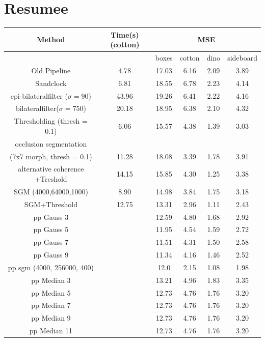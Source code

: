\documentclass  [
  paper    = a4,
  BCOR     = 10mm,
  twoside,
  fontsize = 12pt,
  fleqn,
  toc      = bibnumbered,
  toc      = listofnumbered,
  numbers  = noendperiod,
  headings = normal,
  listof   = leveldown,
  version  = 3.03
]                                       {scrreprt}
\begin{document}
\section{Resumee}
\begin{table}
	\begin{tabular}{|c|c|c|c|c|c|}
		\hline 
		Method & Time(s) (cotton) & \multicolumn{4}{c|}{MSE} \\ 
		\hline 
		&  & boxes & cotton & dino & sideboard \\ 
		\hline
		Old Pipeline & 4.78 & 17.03 & 6.16 & 2.09 & 3.89 \\
		\hline 
		Sandclock & 6.81  & 18.55  & 6.78  & 2.23  & 4.14 \\ 
		\hline 
		epi-bilateralfilter ($\sigma = 90$) &  43.96 &  19.26  & 6.41  & 2.22  & 4.16  \\ 
		\hline 
		bilateralfilter($\sigma = 750$) & 20.18  & 18.95  &  6.38 & 2.10  &4.32  \\ 
		\hline 
		Thresholding (thresh = 0.1) & 6.06 & 15.57  & 4.38  & 1.39  & 3.03  \\ 
		\hline 
		occlusion segmentation&&&&&\\(7x7 morph, thresh = 0.1) & 11.28  & 18.08 &  3.39 & 1.78  & 3.91  \\ 
		\hline 
		alternative coherence +Treshold & 14.15  & 15.85  & 4.30  & 1.25  & 3.38  \\ 
		\hline 
		SGM (4000,64000,1000) & 8.90 & 14.98  & 3.84  & 1.75  & 3.18  \\ 
		\hline 
		SGM+Threshold & 12.75  & 13.31  & 2.96   & 1.11   & 2.43 \\ 
		\hline 
		\hline
		pp Gauss 3 & & 12.59 & 4.80 & 1.68 & 2.92 \\
		\hline
		pp Gauss 5 & & 11.95 & 4.54 & 1.59 &  2.72 \\
		\hline 
		pp Gauss 7 & & 11.51 & 4.31 & 1.50 & 2.58 \\
		\hline
		pp Gauss 9 & & 11.34 & 4.16 & 1.46 & 2.52 \\
		\hline
		pp sgm (4000, 256000, 400) & &12.0 & 2.15 & 1.08 & 1.98\\
		\hline
		pp Median 3 & & 13.21 & 4.96 & 1.83 & 3.35 \\
		\hline
		pp Median 5 & & 12.73 & 4.76 & 1.76 & 3.20 \\
		\hline
		pp Median 7 & & 12.73 & 4.76 & 1.76 & 3.20 \\
		\hline 
		pp Median 9 & & 12.73 & 4.76 & 1.76 &3.20 \\
		\hline 
		pp Median 11 & & 12.73 & 4.76 & 1.76 &3.20 \\
	\end{tabular} 
\end{table}
\end{document}
